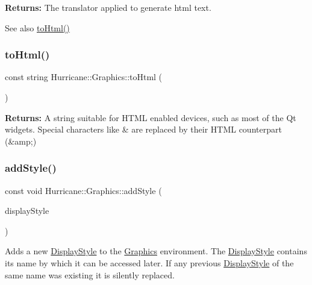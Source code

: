 {\bfseries Returns\+:} The translator applied to generate html text. \begin{DoxySeeAlso}{See also}
\mbox{\hyperlink{classHurricane_1_1Graphics_a51b3772138b33a85204abbee08898987}{to\+Html()}} 
\end{DoxySeeAlso}
\mbox{\label{classHurricane_1_1Graphics_a51b3772138b33a85204abbee08898987}} 
\subsubsection{\texorpdfstring{to\+Html()}{toHtml()}}
{\footnotesize\ttfamily const string Hurricane\+::\+Graphics\+::to\+Html (\begin{DoxyParamCaption}\item[{const string \&}]{ }\end{DoxyParamCaption})\hspace{0.3cm}{\ttfamily [static]}}

{\bfseries Returns\+:} A string suitable for H\+T\+ML enabled devices, such as most of the Qt widgets. Special characters like {\ttfamily \textquotesingle{}\&\textquotesingle{}} are replaced by their H\+T\+ML counterpart ({\ttfamily \&amp};) \mbox{\label{classHurricane_1_1Graphics_ac64dd095224b3f9dfbbdcfc242b11a77}} 
\subsubsection{\texorpdfstring{add\+Style()}{addStyle()}}
{\footnotesize\ttfamily const void Hurricane\+::\+Graphics\+::add\+Style (\begin{DoxyParamCaption}\item[{\mbox{\hyperlink{classHurricane_1_1DisplayStyle}{Display\+Style}} $\ast$}]{display\+Style }\end{DoxyParamCaption})\hspace{0.3cm}{\ttfamily [static]}}

Adds a new \mbox{\hyperlink{classHurricane_1_1DisplayStyle}{Display\+Style}} to the \mbox{\hyperlink{classHurricane_1_1Graphics}{Graphics}} environment. The \mbox{\hyperlink{classHurricane_1_1DisplayStyle}{Display\+Style}} contains it\textquotesingle{}s name by which it can be accessed later. If any previous \mbox{\hyperlink{classHurricane_1_1DisplayStyle}{Display\+Style}} of the same name was existing it is silently replaced. \mbox{\label{classHurricane_1_1Graphics_acb9975e354d7c802fa3064ceb800db90}} 
